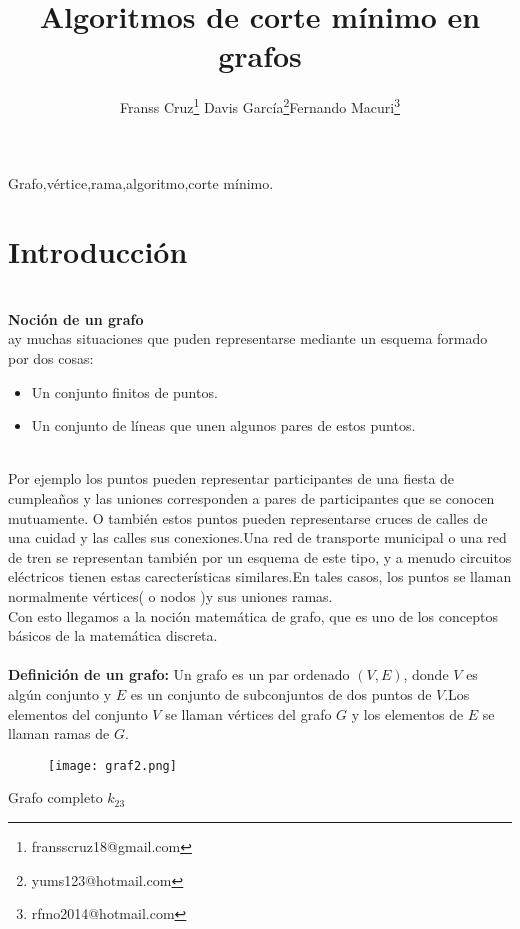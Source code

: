 \documentclass[a4,papper]{IEEEtran}
\title{Algoritmos de corte mínimo en grafos}
\author{Franss Cruz\quad\thanks{fransscruz18@gmail.com}
Davis García\quad\thanks{yums123@hotmail.com}Fernando Macuri\quad\thanks{rfmo2014@hotmail.com}}
\begin{document}
\maketitle
\begin{IEEEkeywords}
Grafo,vértice,rama,algoritmo,corte mínimo.
\end{IEEEkeywords}
\section{Introducción}
\ \\[1pt]
{\noindent \large \bf{Noción de un grafo}}\\
ay muchas situaciones que puden representarse mediante un esquema formado por dos cosas:
\begin{itemize}[]
\item Un conjunto finitos de puntos.
\item Un conjunto de líneas que unen algunos pares de estos puntos.
\end{itemize}\\

\noindent Por ejemplo los puntos pueden representar participantes de una fiesta de cumpleaños y las uniones corresponden a pares de participantes que se conocen mutuamente. O también estos puntos pueden representarse cruces de calles de una cuidad y las calles sus conexiones.Una red de transporte municipal o una red de tren se representan también por un esquema de este tipo, y a menudo circuitos eléctricos tienen estas carecterísticas similares.En tales casos, los puntos se llaman normalmente vértices( o nodos )y sus uniones ramas.\\
Con esto llegamos a la noción matemática de grafo, que es uno de los conceptos básicos de la matemática discreta.\\
\ \\[1mm]
{\large \bf {Definición de un grafo:}}
Un grafo es un par ordenado $(V,E)$, donde $V$ es algún conjunto y $E$ es un conjunto de subconjuntos de dos puntos de $V$.Los elementos del conjunto $V$ se llaman vértices del grafo $G$ y los elementos de $E$ se llaman ramas de $G$. \\

\begin{figure}[H]
    \centering
    \texttt{[image: graf2.png]}
\end{figure}   
\begin{center}
Grafo completo $k_{23}$
\end{center}
\end{document}
